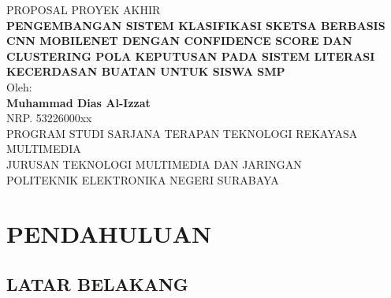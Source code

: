 \documentclass[12pt,a4paper,oneside,openany]{report}
\begin{document}

\begin{titlepage}
\centering
\vspace*{2cm}
{\fontsize{14pt}{16pt}\selectfont PROPOSAL PROYEK AKHIR}\\[1cm]
{\fontsize{14pt}{18pt}\selectfont\bfseries\MakeUppercase{Pengembangan Sistem Klasifikasi Sketsa Berbasis CNN MobileNet dengan Confidence Score dan Clustering Pola Keputusan pada Sistem Literasi Kecerdasan Buatan untuk Siswa SMP}}\\[2cm]
{\fontsize{12pt}{14pt}\selectfont Oleh:}\\[0.3cm]
{\fontsize{12pt}{14pt}\selectfont\bfseries Muhammad Dias Al-Izzat}\\[0.2cm]
{\fontsize{12pt}{14pt}\selectfont NRP. 53226000xx}\\[2cm]
{\fontsize{12pt}{14pt}\selectfont PROGRAM STUDI SARJANA TERAPAN TEKNOLOGI REKAYASA MULTIMEDIA}\\[0.2cm]
{\fontsize{12pt}{14pt}\selectfont JURUSAN TEKNOLOGI MULTIMEDIA DAN JARINGAN}\\[0.2cm]
{\fontsize{12pt}{14pt}\selectfont POLITEKNIK ELEKTRONIKA NEGERI SURABAYA}\\[0.2cm]
{\fontsize{12pt}{14pt}}
\end{titlepage}

\chapter{PENDAHULUAN}
\label{chap:bab1}

\section{LATAR BELAKANG}
\label{sec:latar-belakang}
\end{document}
